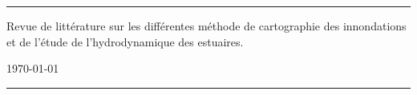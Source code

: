 \fancyhead[C]{}
\hrule \medskip
\begin{minipage}{0.295\textwidth} 
\raggedright
\footnotesize
\yourname \hfill
\end{minipage}
\begin{minipage}{0.4\textwidth} 
\centering 
\large 
Revue de littérature sur les différentes méthode de cartographie des innondations et de l'étude de l'hydrodynamique des estuaires.
\normalsize 
\end{minipage}
\begin{minipage}{0.295\textwidth} 
\raggedleft
\today\hfill\\
\end{minipage}
\medskip\hrule 
\bigskip
